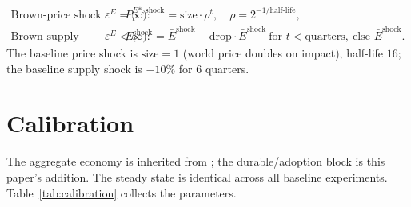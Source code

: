 \documentclass[11pt,a4paper]{article}
\begin{document}
\begin{align}
\text{Brown-price shock (requires }\varepsilon^{E}=\infty):&\quad
P^{E*,\text{shock}}_t=\text{size}\cdot\rho^{t},\quad \rho=2^{-1/\text{half-life}},\\
\text{Brown-supply shock (requires }\varepsilon^{E}<\infty):&\quad
E^{\text{shock}}_t=\bar E^{\text{shock}}-\text{drop}\cdot\bar E^{\text{shock}}\ \text{for }t<\text{quarters},\ \text{else }\bar E^{\text{shock}} .
\end{align}
The baseline price shock is $\text{size}=1$ (world price doubles on impact),
half-life $16$; the baseline supply shock is $-10\%$ for $6$ quarters.

\section{Calibration}\label{sec:cal}

The aggregate economy is inherited from \citet{ARS2024}; the durable/adoption
block is this paper's addition. The steady state is identical across all baseline
experiments. Table~\ref{tab:calibration} collects the parameters.
\end{document}
